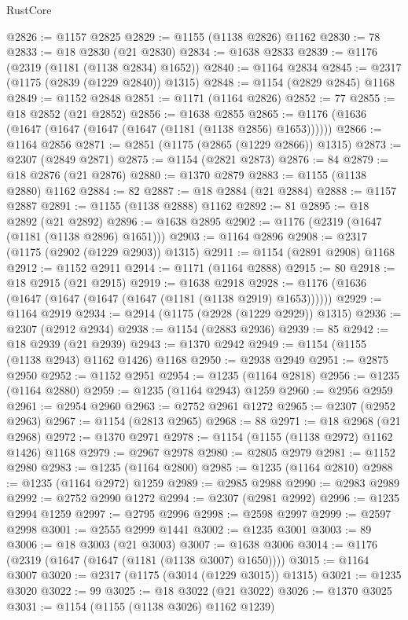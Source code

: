 \begin{lexlean}{RustCore}
\begin{coremodule}
@2826 := @1157 @2825
@2829 := @1155 (@1138 @2826) @1162
@2830 := 78
@2833 := @18 @2830 (@21 @2830)
@2834 := @1638 @2833
@2839 := @1176 (@2319 (@1181 (@1138 @2834) @1652))
@2840 := @1164 @2834
@2845 := @2317 (@1175 (@2839 (@1229 @2840)) @1315)
@2848 := @1154 (@2829 @2845) @1168
@2849 := @1152 @2848
@2851 := @1171 (@1164 @2826)
@2852 := 77
@2855 := @18 @2852 (@21 @2852)
@2856 := @1638 @2855
@2865 := @1176 (@1636 (@1647 (@1647 (@1647 (@1647 (@1181 (@1138 @2856) @1653))))))
@2866 := @1164 @2856
@2871 := @2851 (@1175 (@2865 (@1229 @2866)) @1315)
@2873 := @2307 (@2849 @2871)
@2875 := @1154 (@2821 @2873)
@2876 := 84
@2879 := @18 @2876 (@21 @2876)
@2880 := @1370 @2879
@2883 := @1155 (@1138 @2880) @1162
@2884 := 82
@2887 := @18 @2884 (@21 @2884)
@2888 := @1157 @2887
@2891 := @1155 (@1138 @2888) @1162
@2892 := 81
@2895 := @18 @2892 (@21 @2892)
@2896 := @1638 @2895
@2902 := @1176 (@2319 (@1647 (@1181 (@1138 @2896) @1651)))
@2903 := @1164 @2896
@2908 := @2317 (@1175 (@2902 (@1229 @2903)) @1315)
@2911 := @1154 (@2891 @2908) @1168
@2912 := @1152 @2911
@2914 := @1171 (@1164 @2888)
@2915 := 80
@2918 := @18 @2915 (@21 @2915)
@2919 := @1638 @2918
@2928 := @1176 (@1636 (@1647 (@1647 (@1647 (@1647 (@1181 (@1138 @2919) @1653))))))
@2929 := @1164 @2919
@2934 := @2914 (@1175 (@2928 (@1229 @2929)) @1315)
@2936 := @2307 (@2912 @2934)
@2938 := @1154 (@2883 @2936)
@2939 := 85
@2942 := @18 @2939 (@21 @2939)
@2943 := @1370 @2942
@2949 := @1154 (@1155 (@1138 @2943) @1162 @1426) @1168
@2950 := @2938 @2949
@2951 := @2875 @2950
@2952 := @1152 @2951
@2954 := @1235 (@1164 @2818)
@2956 := @1235 (@1164 @2880)
@2959 := @1235 (@1164 @2943) @1259
@2960 := @2956 @2959
@2961 := @2954 @2960
@2963 := @2752 @2961 @1272
@2965 := @2307 (@2952 @2963)
@2967 := @1154 (@2813 @2965)
@2968 := 88
@2971 := @18 @2968 (@21 @2968)
@2972 := @1370 @2971
@2978 := @1154 (@1155 (@1138 @2972) @1162 @1426) @1168
@2979 := @2967 @2978
@2980 := @2805 @2979
@2981 := @1152 @2980
@2983 := @1235 (@1164 @2800)
@2985 := @1235 (@1164 @2810)
@2988 := @1235 (@1164 @2972) @1259
@2989 := @2985 @2988
@2990 := @2983 @2989
@2992 := @2752 @2990 @1272
@2994 := @2307 (@2981 @2992)
@2996 := @1235 @2994 @1259
@2997 := @2795 @2996
@2998 := @2598 @2997
@2999 := @2597 @2998
@3001 := @2555 @2999 @1441
@3002 := @1235 @3001
@3003 := 89
@3006 := @18 @3003 (@21 @3003)
@3007 := @1638 @3006
@3014 := @1176 (@2319 (@1647 (@1647 (@1181 (@1138 @3007) @1650))))
@3015 := @1164 @3007
@3020 := @2317 (@1175 (@3014 (@1229 @3015)) @1315)
@3021 := @1235 @3020
@3022 := 99
@3025 := @18 @3022 (@21 @3022)
@3026 := @1370 @3025
@3031 := @1154 (@1155 (@1138 @3026) @1162 @1239)

\end{coremodule}
\end{lexlean}
